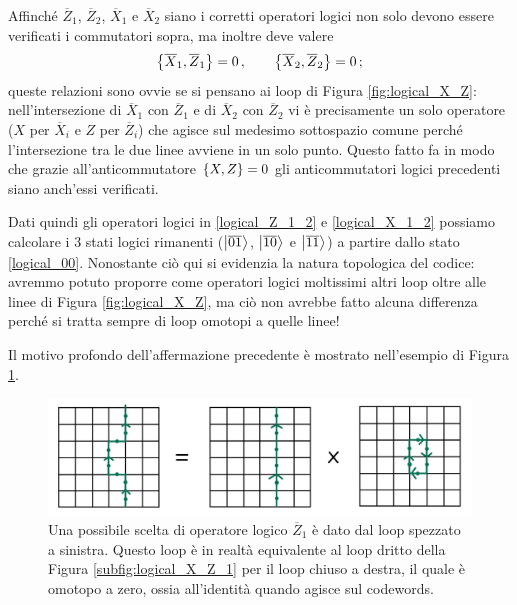 \noindent Affinché $\overline{Z}_1$, $\overline{Z}_2$, $\overline{X}_1$ e $\overline{X}_2$ siano i corretti operatori logici non solo devono essere verificati i commutatori sopra, ma inoltre deve valere
\begin{equation*}
    \acomm{\overline{X}_1}{\overline{Z}_1} = 0 \, , \qquad \acomm{\overline{X}_2}{\overline{Z}_2} = 0 \, ;
\end{equation*}
queste relazioni sono ovvie se si pensano ai loop di Figura \ref{fig:logical_X_Z}: nell'intersezione di $\overline{X}_1$ con $\overline{Z}_1$ e di $\overline{X}_2$ con $\overline{Z}_2$ vi è precisamente un solo operatore ($X$ per $\overline{X}_i$ e $Z$ per $\overline{Z}_i$) che agisce sul medesimo sottospazio comune perché l'intersezione tra le due linee avviene in un solo punto. Questo fatto fa in modo che grazie all'anticommutatore $\acomm{X}{Z} = 0$ gli anticommutatori logici precedenti siano anch'essi verificati.  

\noindent Dati quindi gli operatori logici in \eqref{logical_Z_1_2} e \eqref{logical_X_1_2} possiamo calcolare i 3 stati logici rimanenti ($\ket{\overline{01}}$, $\ket{\overline{10}}$ e $\ket{\overline{11}}$) a partire dallo stato \eqref{logical_00}. Nonostante ciò qui si evidenzia la natura topologica del codice: avremmo potuto proporre come operatori logici moltissimi altri loop oltre alle linee di Figura \ref{fig:logical_X_Z}, ma ciò non avrebbe fatto alcuna differenza perché si tratta sempre di loop omotopi a quelle linee!

\noindent Il motivo profondo dell'affermazione precedente è mostrato nell'esempio di Figura \ref{fig:topological_loops}. 

\begin{figure}[!ht]
    \centering
    \includegraphics[scale=0.33]{images/topological_loops}
    \caption{Una possibile scelta di operatore logico $\overline{Z}_1$ è dato dal loop spezzato a sinistra. Questo loop è in realtà equivalente al loop dritto della Figura \ref{subfig:logical_X_Z_1} per il loop chiuso a destra, il quale è omotopo a zero, ossia all'identità quando agisce sul codewords.}
    \label{fig:topological_loops}
\end{figure}

